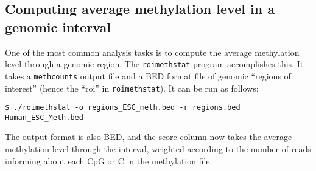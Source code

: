 \documentclass[10pt]{article}
\newcommand{\prog}[1]{\texttt{#1}}
\newcommand{\fn}[1]{\texttt{#1}}
\begin{document}




\subsection{Computing average methylation level in a genomic interval}
\label{sec:roimethstat}

One of the most common analysis tasks is to compute the average
methylation level through a genomic region. The \prog{roimethstat}
program accomplishes this. It takes a \prog{methcounts} output file
and a BED format file of genomic ``regions of interest'' (hence the
``roi'' in \prog{roimethstat}). It can be run as follows:
\begin{verbatim}
$ ./roimethstat -o regions_ESC_meth.bed -r regions.bed Human_ESC_Meth.bed
\end{verbatim}
The output format is also BED, and the score column now takes the
average methylation level through the interval, weighted according to
the number of reads informing about each CpG or C in the methylation
file.
\end{document}
